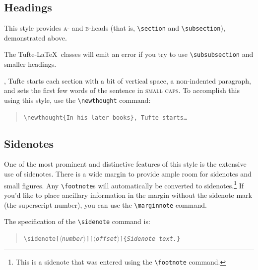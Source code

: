 \documentclass{tufte-handout}
\newcommand{\doccmd}[1]{\texttt{\textbackslash#1}}%
\newcommand{\docopt}[1]{\ensuremath{\langle}\textrm{\textit{#1}}\ensuremath{\rangle}}%
\newcommand{\docarg}[1]{\textrm{\textit{#1}}}%
\newenvironment{docspec}{\begin{quote}\noindent}{\end{quote}}%
\begin{document}
\subsection{Headings}\label{sec:headings}
This style provides \textsc{a}- and \textsc{b}-heads (that is,
\Verb|\section| and \Verb|\subsection|), demonstrated above.

The Tufte-\LaTeX\ classes will emit an error if you try to use
\linebreak\Verb|\subsubsection| and smaller headings.

,\cite{Tufte2006} Tufte
starts each section with a bit of vertical space, a non-indented paragraph,
and sets the first few words of the sentence in \textsc{small caps}.  To
accomplish this using this style, use the \Verb|\newthought| command:
\begin{docspec}
  \doccmd{newthought\{In his later books\}, Tufte starts\ldots}
\end{docspec}

\subsection{Sidenotes}\label{sec:sidenotes}
One of the most prominent and distinctive features of this style is the
extensive use of sidenotes.  There is a wide margin to provide ample room
for sidenotes and small figures.  Any \Verb|\footnote|s will automatically
be converted to sidenotes.\footnote{This is a sidenote that was entered
  using the \texttt{\textbackslash footnote} command.}	If you'd like to place
ancillary
information in the margin without the sidenote mark (the superscript
number), you can use the \Verb|\marginnote| command.

The specification of the \Verb|\sidenote| command is:
\begin{docspec}
  \doccmd{sidenote[\docopt{number}][\docopt{offset}]\{\docarg{Sidenote
      text.}\}}
\end{docspec}
\end{document}
